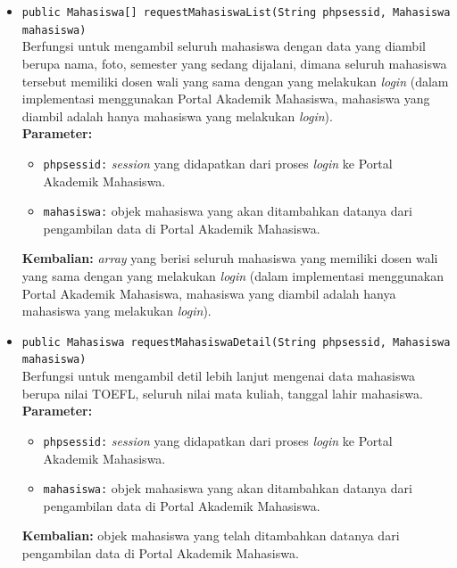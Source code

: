 \begin{enumerate}
\begin{itemize}
		\item \texttt{public Mahasiswa[] requestMahasiswaList(String phpsessid, Mahasiswa mahasiswa)}\\
		\label{requestMahasiswaList}
	    Berfungsi untuk mengambil seluruh mahasiswa dengan data yang diambil berupa nama, foto, semester yang sedang dijalani, dimana seluruh mahasiswa tersebut memiliki dosen wali yang sama dengan yang melakukan \textit{login} (dalam implementasi menggunakan Portal Akademik Mahasiswa, mahasiswa yang diambil adalah hanya mahasiswa yang melakukan \textit{login}).\\
		\textbf{Parameter:}
			\begin{itemize}
				\item \texttt{phpsessid:} \textit{session} yang didapatkan dari proses \textit{login} ke Portal Akademik Mahasiswa.
				\item \texttt{mahasiswa:} objek mahasiswa yang akan ditambahkan datanya dari pengambilan data di Portal Akademik Mahasiswa.
			\end{itemize}
		\textbf{Kembalian:} \textit{array} yang berisi seluruh mahasiswa yang memiliki dosen wali yang sama dengan yang melakukan \textit{login} (dalam implementasi menggunakan Portal Akademik Mahasiswa, mahasiswa yang diambil adalah hanya mahasiswa yang melakukan \textit{login}).
		
		\item \texttt{public Mahasiswa requestMahasiswaDetail(String phpsessid, Mahasiswa mahasiswa)}\\
		\label{requestMahasiswaDetail}
	    Berfungsi untuk mengambil detil lebih lanjut mengenai data mahasiswa berupa nilai TOEFL, seluruh nilai mata kuliah, tanggal lahir mahasiswa.\\
		\textbf{Parameter:}
			\begin{itemize}
				\item \texttt{phpsessid:} \textit{session} yang didapatkan dari proses \textit{login} ke Portal Akademik Mahasiswa.
				\item \texttt{mahasiswa:} objek mahasiswa yang akan ditambahkan datanya dari pengambilan data di Portal Akademik Mahasiswa.
			\end{itemize}
		\textbf{Kembalian:} objek mahasiswa yang telah ditambahkan datanya dari pengambilan data di Portal Akademik Mahasiswa.
	\end{itemize}
	

\end{enumerate}
